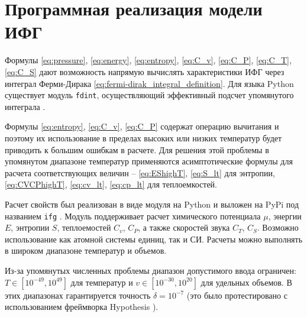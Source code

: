 \section{Программная реализация модели ИФГ}
Формулы \eqref{eq:pressure}, \eqref{eq:energy}, \eqref{eq:entropy}, \eqref{eq:C_v}, \eqref{eq:C_P}, \eqref{eq:C_T}, \eqref{eq:C_S} дают возможность напрямую вычислять характеристики ИФГ через интеграл Ферми-Дирака \eqref{eq:fermi-dirak_integral_definition}.
Для языка Python существует модуль \texttt{fdint}, осуществляющий эффективный подсчет упомянутого интеграла \cite{fdint}.

Формулы \eqref{eq:entropy}, \eqref{eq:C_v}, \eqref{eq:C_P} содержат операцию вычитания и поэтому их использование в пределах высоких или низких температур будет приводить к большим ошибкам в расчете.
Для решения этой проблемы в упомянутом диапазоне температур применяются асимптотические формулы для расчета соответствующих величин -- \eqref{eq:EShighT}, \eqref{eq:S_lt} для энтропии, \eqref{eq:CVCPhighT}, \eqref{eq:cv_lt}, \eqref{eq:cp_lt} для теплоемкостей.

Расчет свойств был реализован в виде модуля на Python и выложен на PyPi под названием \texttt{ifg} \cite{ifgpy}.
Модуль поддерживает расчет химического потенциала $\mu$, энергии $E$, энтропии $S$, теплоемостей $C_v$, $C_P$, а также скоростей звука $C_T$, $C_S$.
Возможно использование как атомной системы единиц, так и СИ.
Расчеты можно выполнять в широком диапазоне температур и объемов.

Из-за упомянутых численных проблемы диапазон допустимого ввода ограничен: $T \in [10^{-49}, 10^{49}]$ для температур и $v \in [10^{-30}, 10^{20}]$ для удельных объемов.
В этих диапазонах гарантируется точность $\delta = 10^{-7}$ (это было протестировано с использованием фреймворка Hypothesis \cite{MacIver2019Hypothesis}).



